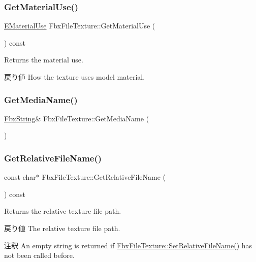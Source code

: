 \subsubsection{\texorpdfstring{Get\+Material\+Use()}{GetMaterialUse()}}
{\footnotesize\ttfamily \hyperlink{class_fbx_file_texture_ae85eb429015d450d8cb8a753634c0d1e}{E\+Material\+Use} Fbx\+File\+Texture\+::\+Get\+Material\+Use (\begin{DoxyParamCaption}{ }\end{DoxyParamCaption}) const}

Returns the material use. \begin{DoxyReturn}{戻り値}
How the texture uses model material. 
\end{DoxyReturn}
\mbox{\label{class_fbx_file_texture_afbd2a201ca55d31987446e33133f53cd}} 
\subsubsection{\texorpdfstring{Get\+Media\+Name()}{GetMediaName()}}
{\footnotesize\ttfamily \hyperlink{class_fbx_string}{Fbx\+String}\& Fbx\+File\+Texture\+::\+Get\+Media\+Name (\begin{DoxyParamCaption}{ }\end{DoxyParamCaption})}

\mbox{\label{class_fbx_file_texture_a66dda210b8186cedba3d7543ce77a363}} 
\subsubsection{\texorpdfstring{Get\+Relative\+File\+Name()}{GetRelativeFileName()}}
{\footnotesize\ttfamily const char$\ast$ Fbx\+File\+Texture\+::\+Get\+Relative\+File\+Name (\begin{DoxyParamCaption}{ }\end{DoxyParamCaption}) const}

Returns the relative texture file path. \begin{DoxyReturn}{戻り値}
The relative texture file path. 
\end{DoxyReturn}
\begin{DoxyRemark}{注釈}
An empty string is returned if \hyperlink{class_fbx_file_texture_a460992bc85c4087da594b60da1f2c6f5}{Fbx\+File\+Texture\+::\+Set\+Relative\+File\+Name()} has not been called before. 
\end{DoxyRemark}
\mbox{\label{class_fbx_file_texture_ad9c266407fb8319af33c1969144d6d1e}} 
